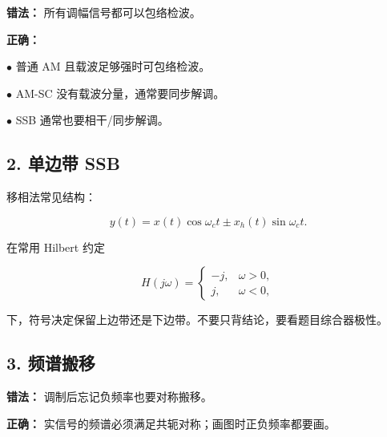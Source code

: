 \documentclass[11pt]{ctexart}
\begin{document}
\textbf{错法：} 所有调幅信号都可以包络检波。\par



\textbf{正确：}\par



\noindent\(\bullet\) 普通 AM 且载波足够强时可包络检波。\par

\noindent\(\bullet\) AM-SC 没有载波分量，通常要同步解调。\par

\noindent\(\bullet\) SSB 通常也要相干/同步解调。\par



\subsection*{2. 单边带 SSB}



移相法常见结构：\par

\[

y(t)=x(t)\cos\omega_ct\pm x_h(t)\sin\omega_ct.

\]



在常用 Hilbert 约定\par

\[

H(j\omega)=

\begin{cases}

-j,&\omega>0,\\

j,&\omega<0,

\end{cases}

\]

下，符号决定保留上边带还是下边带。不要只背结论，要看题目综合器极性。\par



\subsection*{3. 频谱搬移}



\textbf{错法：} 调制后忘记负频率也要对称搬移。\par



\textbf{正确：} 实信号的频谱必须满足共轭对称；画图时正负频率都要画。\par
\end{document}

